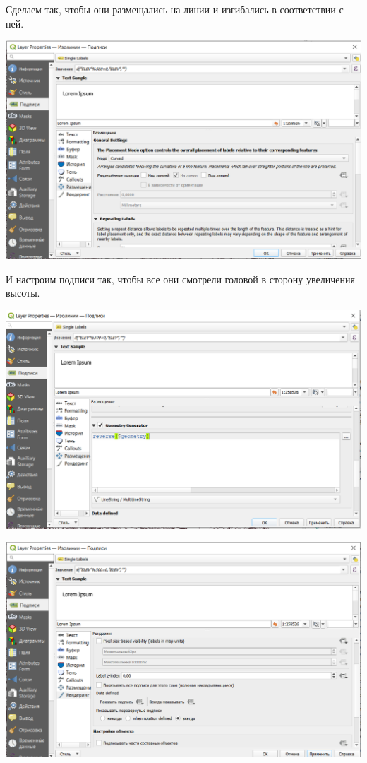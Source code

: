 \documentclass[
]{book}
\begin{document}
Сделаем так, чтобы они размещались на линии и изгибались в соответствии с ней.

\includegraphics{figures/91.PNG}

И настроим подписи так, чтобы все они смотрели головой в сторону увеличения высоты.

\includegraphics{figures/92.PNG}

\includegraphics{figures/93.PNG}
\end{document}

